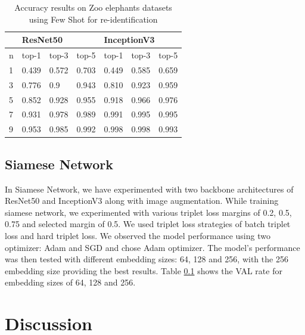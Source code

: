 \documentclass[10pt,twocolumn,letterpaper]{article}
\begin{document}
\begin{table}[]
\begin{tabular}{@{}lllllll@{}}
\toprule
                       & \multicolumn{3}{l}{ResNet50}               & \multicolumn{3}{l}{InceptionV3} \\ \midrule
\multicolumn{1}{l|}{n} & top-1 & top-3 & \multicolumn{1}{l|}{top-5} & top-1     & top-3    & top-5    \\
\multicolumn{1}{l|}{1} & 0.439 & 0.572 & \multicolumn{1}{l|}{0.703} & 0.449     & 0.585    & 0.659    \\
\multicolumn{1}{l|}{3} & 0.776 & 0.9   & \multicolumn{1}{l|}{0.943} & 0.810     & 0.923    & 0.959    \\
\multicolumn{1}{l|}{5} & 0.852 & 0.928 & \multicolumn{1}{l|}{0.955} & 0.918     & 0.966    & 0.976    \\
\multicolumn{1}{l|}{7} & 0.931 & 0.978 & \multicolumn{1}{l|}{0.989} & 0.991     & 0.995    & 0.995    \\
\multicolumn{1}{l|}{9} & 0.953 & 0.985 & \multicolumn{1}{l|}{0.992} & 0.998     & 0.998    & 0.993   
\end{tabular}
\caption{Accuracy results on Zoo elephants datasets using Few Shot for re-identification}
\label{tab:few-shot-results}
\end{table}


\subsection{Siamese Network}

In Siamese Network, we have  experimented with two backbone architectures of ResNet50 and InceptionV3 along with image augmentation. While training siamese network, we experimented with various triplet loss margins of 0.2, 0.5, 0.75 and selected margin of 0.5. We used triplet loss strategies of batch triplet loss and hard triplet loss. We observed the model performance using two optimizer: Adam and SGD and chose Adam optimizer. The model's performance was then tested with different embedding sizes: 64, 128 and 256, with the 256 embedding size providing the best results. Table \ref{} shows the VAL rate for embedding sizes of 64, 128 and 256.


\section{Discussion}
\label{sec:discussion}
\end{document}
